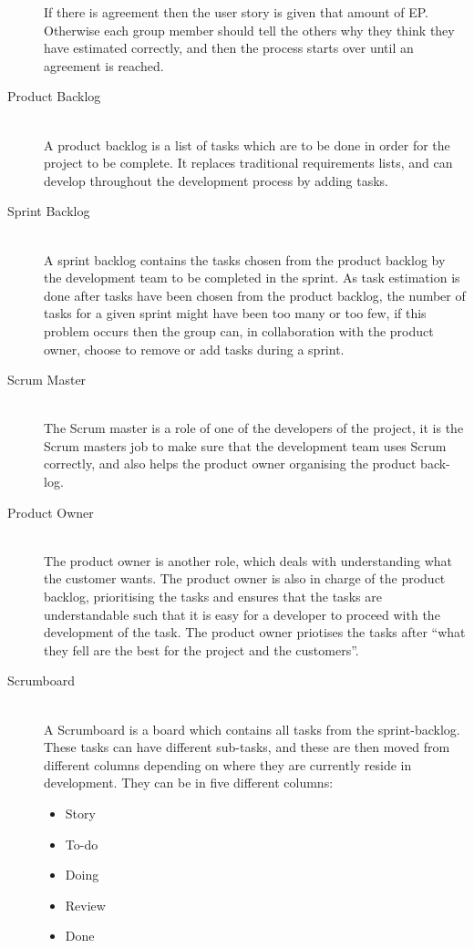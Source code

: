 \begin{description}
	If there is agreement then the user story is given that amount of EP.
	Otherwise each group member should tell the others why they think they have estimated correctly, and then the process starts over until an agreement is reached.
	\item[Product Backlog] \hfill \\
	A product backlog is a list of tasks which are to be done in order for the project to be complete.
	It replaces traditional requirements lists, and can develop throughout the development process by adding tasks.
	\item[Sprint Backlog] \hfill \\
	A sprint backlog contains the tasks chosen from the product backlog by the development team to be completed in the sprint.
	As task estimation is done after tasks have been chosen from the product backlog, the number of tasks for a given sprint might have been too many or too few, if this problem occurs then the group can, in collaboration with the product owner, choose to remove or add tasks during a sprint.
	\item[Scrum Master] \hfill \\
	The Scrum master is a role of one of the developers of the project, it is the Scrum masters job to make sure that the development team uses Scrum correctly, and also helps the product owner organising the product back-log.
	\item[Product Owner] \hfill \\
	The product owner is another role, which deals with understanding what the customer wants.
	The product owner is also in charge of the product backlog, prioritising the tasks and ensures that the tasks are understandable such that it is easy for a developer to proceed with the development of the task.
	The product owner priotises the tasks after \enquote{what they fell are the best for the project and the customers}.
	\item[Scrumboard] \hfill \\
	A Scrumboard is a board which contains all tasks from the sprint-backlog.
	These tasks can have different sub-tasks, and these are then moved from different columns depending on where they are currently reside in development.
	They can be in five different columns:
	\begin{multicols}{5}
		\begin{itemize}
		\item Story
		\item To-do
		\item Doing
		\item Review
		\item Done
	\end{itemize}
	\end{multicols}


\end{description}
